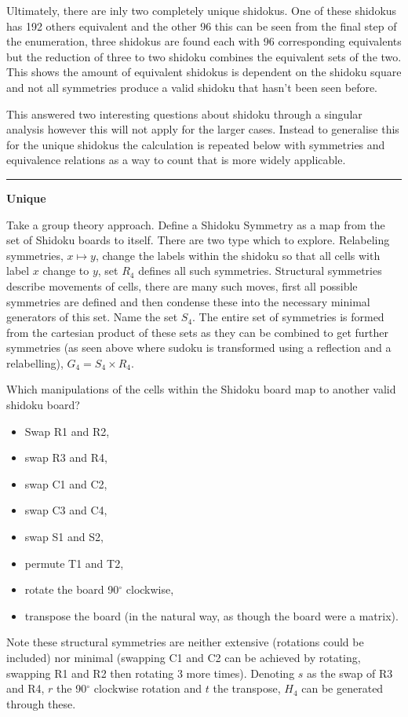 \documentclass[a4paper,11pt]{report}
\begin{document}
Ultimately, there are inly two completely unique shidokus. One of these shidokus has 192 others equivalent and the other 96 this can be seen from the final step of the enumeration, three shidokus are found each with 96 corresponding equivalents but the reduction of three to two shidoku combines the equivalent sets of the two. This shows the amount of equivalent shidokus is dependent on the shidoku square and not all symmetries produce a valid shidoku that hasn't been seen before.

This answered two interesting questions about shidoku through a singular analysis however this will not apply for the larger cases. Instead to generalise this for the unique shidokus the calculation is repeated below with symmetries and equivalence relations as a way to count that is more widely applicable.

\noindent\rule{4cm}{0.4pt}

\textbf{Unique}

Take a group theory approach. Define a Shidoku Symmetry as a map from the set of Shidoku boards to itself. There are two type which to explore. Relabeling symmetries, $x\mapsto y$, change the labels within the shidoku so that all cells with label $x$ change to $y$, set $R_4$ defines all such symmetries. Structural symmetries describe movements of cells, there are many such moves, first all possible symmetries are defined and then condense these into the necessary minimal generators of this set. Name the set $S_4$. The entire set of symmetries is formed from the cartesian product of these sets as they can be combined to get further symmetries (as seen above where sudoku is transformed using a reflection and a relabelling), $G_4=S_4\times R_4$.

Which manipulations of the cells within the Shidoku board map to another valid shidoku board? 
\begin{itemize}
\item Swap R1 and R2,
\item swap R3 and R4,
\item swap C1 and C2,
\item swap C3 and C4,
\item swap S1 and S2,
\item permute T1 and T2,
\item rotate the board 90$^\circ$ clockwise,
\item transpose the board (in the natural way, as though the board were a matrix).
\end{itemize}
Note these structural symmetries are neither extensive (rotations could be included) nor minimal (swapping C1 and C2 can be achieved by rotating, swapping R1 and R2 then rotating 3 more times). Denoting $s$ as the swap of R3 and R4, $r$ the 90$^\circ$ clockwise rotation and $t$ the transpose, $H_4$ can be generated through these.
\end{document}
